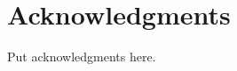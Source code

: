 \thispagestyle{empty}

\begingroup
\section*{Acknowledgments}
Put  acknowledgments here.

\endgroup



